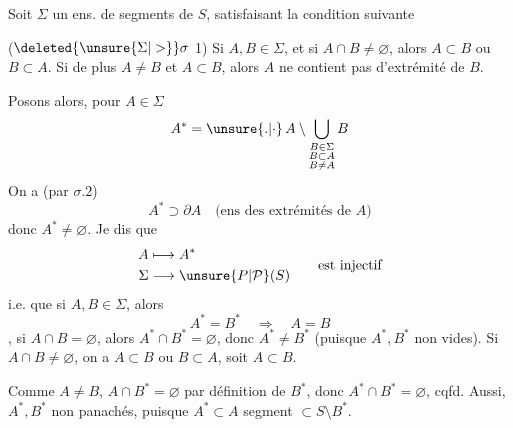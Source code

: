 Soit $\Sigma$ un ens. de segments de $S$, satisfaisant la condition suivante

($\deleted{\unsure{\Sigma|>}}\sigma$ 1) Si $A,B\in\Sigma$, et si $A\cap B\ne\varnothing$, alors $A\subset B$ ou $B\subset A$.  Si de plus $A\ne B$ et $A\subset B$, alors $A$ ne contient pas d'extrémité de $B$.

Posons alors, pour $A\in\Sigma$
\[
 A^*=\unsure{.|\cdot}\, A\setminus\bigcup_{\substack{B\in\Sigma\\ B\subset A\\ B\ne A}} B
\]
On a (par $\sigma.2$)
\[
 A^*\supset\partial A\quad\text{(ens des extrémités de $A$)}
\]
donc $A^*\ne\varnothing$. Je dis que
\[
 \begin{aligned}
 A&\longmapsto A^*\\
 \Sigma&\longrightarrow \unsure{P|\mathcal P}(S)
 \end{aligned}
 \qquad\text{est injectif}
\]
i.e. que si $A,B\in\Sigma$, alors
\[
 A^*=B^*\quad\Longrightarrow\quad A=B
\]
 , si $A\cap B=\varnothing$, alors $A^*\cap B^*=\varnothing$, donc $A^*\ne B^*$ (puisque $A^*,B^*$ non vides). Si $A\cap B\ne\varnothing$, on a  $A\subset B$ ou $B\subset A$, soit $A\subset B$.

 Comme $A\ne B$, $A\cap B^*=\varnothing$ par définition de $B^*$, donc $A^*\cap B^*=\varnothing$, cqfd.  Aussi, $A^*,B^*$ non panachés, puisque $A^*\subset A$ segment $\subset S\setminus B^*$.
